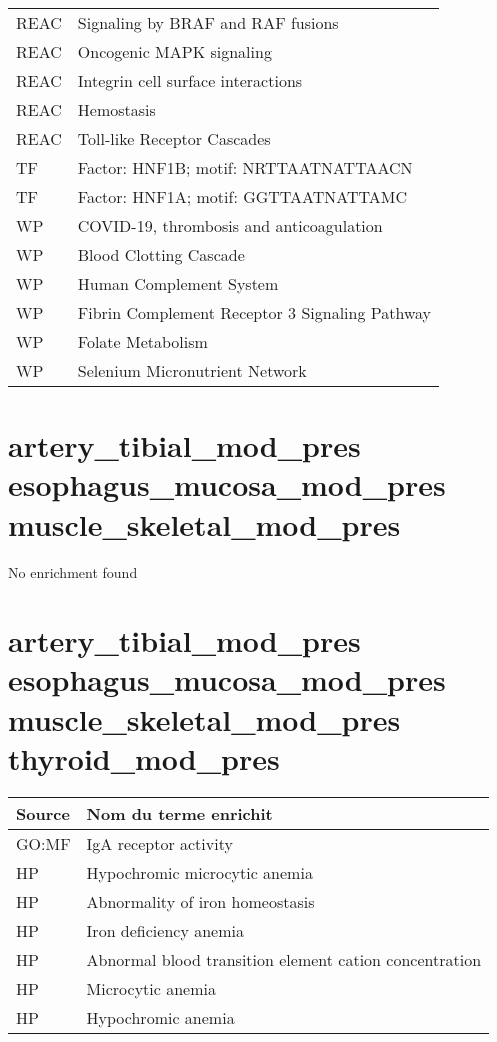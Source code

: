 \begin{longtable}{lp{12cm}}
REAC & Signaling by BRAF and RAF fusions\\
REAC & Oncogenic MAPK signaling\\
REAC & Integrin cell surface interactions\\
REAC & Hemostasis\\
REAC & Toll-like Receptor Cascades\\
TF & Factor: HNF1B; motif: NRTTAATNATTAACN\\
TF & Factor: HNF1A; motif: GGTTAATNATTAMC\\
WP & COVID-19, thrombosis and anticoagulation\\
WP & Blood Clotting Cascade\\
WP & Human Complement System\\
WP & Fibrin Complement Receptor 3 Signaling Pathway\\
WP & Folate Metabolism\\
WP & Selenium Micronutrient Network\\
\bottomrule
\end{longtable}

\section*{artery\_tibial\_mod\_pres \newline esophagus\_mucosa\_mod\_pres \newline muscle\_skeletal\_mod\_pres}
No enrichment found

\section*{artery\_tibial\_mod\_pres \newline esophagus\_mucosa\_mod\_pres \newline muscle\_skeletal\_mod\_pres \newline thyroid\_mod\_pres}

\begin{longtable}{ll}
\toprule
Source & Nom du terme enrichit\\
\midrule
GO:MF & IgA receptor activity\\
HP & Hypochromic microcytic anemia\\
HP & Abnormality of iron homeostasis\\
HP & Iron deficiency anemia\\
HP & Abnormal blood transition element cation concentration\\
HP & Microcytic anemia\\
HP & Hypochromic anemia\\
\bottomrule
\end{longtable}

